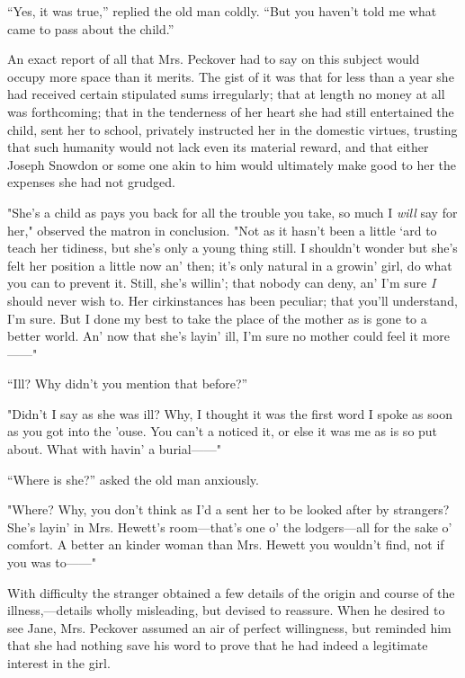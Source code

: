 ``Yes, it was true,'' replied the old man coldly. ``But you haven't told
me what came to pass about the child.''

An exact report of all that Mrs. Peckover had to say on this subject
would occupy more space than it merits. The gist of it was that for less
than a year she had received certain stipulated sums irregularly; that
at length no money at all was forthcoming; that in the tenderness of her
heart she had still entertained the child, sent her to school, privately
instructed her in the domestic virtues, trusting that such humanity
would not lack even its material reward, and that either Joseph
{}Snowdon or some one akin to him would ultimately make good to her the
expenses she had not grudged.

"She's a child as pays you back for all the trouble you take, so much I
\emph{will} say for her," observed the matron in conclusion. "Not as it
hasn't been a little `ard to teach her tidiness, but she's only a young
thing still. I shouldn't wonder but she's felt her position a little now
an' then; it's only natural in a growin' girl, do what you can to
prevent it. Still, she's willin'; that nobody can deny, an' I'm sure
\emph{I} should never wish to. Her cirkinstances has been peculiar; that
you'll understand, I'm sure. But I done my best to take the place of the
mother as is gone to a better world. An' now that she's layin' ill, I'm
sure no mother could feel it more{{------}}"

``Ill? Why didn't you mention that before?''

"Didn't I say as she was ill? Why, I thought it was the first word I
spoke as soon as you got into the 'ouse. You can't a {}noticed it, or
else it was me as is so put about. What with havin' a burial{{------}}"

``Where is she?'' asked the old man anxiously.

"Where? Why, you don't think as I'd a sent her to be looked after by
strangers? She's layin' in Mrs. Hewett's room---that's one o' the
lodgers---all for the sake o' comfort. A better an kinder woman than
Mrs. Hewett you wouldn't find, not if you was to{{------}}"

With difficulty the stranger obtained a few details of the origin and
course of the illness,---details wholly misleading, but devised to
reassure. When he desired to see Jane, Mrs. Peckover assumed an air of
perfect willingness, but reminded him that she had nothing save his word
to prove that he had indeed a legitimate interest in the girl.

